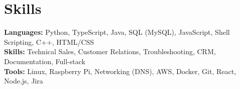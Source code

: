 \documentclass[11pt]{article}       %
\begin{document}
\vspace{-18.5pt}


\section*{Skills}
\textbf{Languages:} Python, TypeScript, Java, SQL (MySQL), JavaScript, Shell Scripting, C++, HTML/CSS\\
\textbf{Skills:} Technical Sales, Customer Relations, Troubleshooting, CRM, Documentation, Full-stack\\
\textbf{Tools:} Linux, Raspberry Pi, Networking (DNS), AWS, Docker, Git, React, Node.js, Jira\\

\vspace{-6.5pt}
\end{document}
